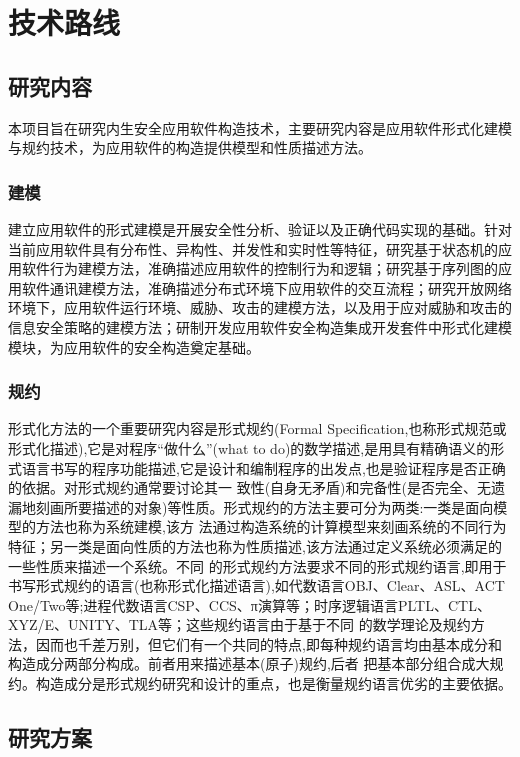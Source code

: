 \chapter{技术路线}
\section{研究内容}
本项目旨在研究内生安全应用软件构造技术，主要研究内容是应用软件形式化建模与规约技术，为应用软件的构造提供模型和性质描述方法。
\subsection{建模}
\par
建立应用软件的形式建模是开展安全性分析、验证以及正确代码实现的基础。针对当前应用软件具有分布性、异构性、并发性和实时性等特征，研究基于状态机的应用软件行为建模方法，准确描述应用软件的控制行为和逻辑；研究基于序列图的应用软件通讯建模方法，准确描述分布式环境下应用软件的交互流程；研究开放网络环境下，应用软件运行环境、威胁、攻击的建模方法，以及用于应对威胁和攻击的信息安全策略的建模方法；研制开发应用软件安全构造集成开发套件中形式化建模模块，为应用软件的安全构造奠定基础。
\par
\subsection{规约}
\par
形式化方法的一个重要研究内容是形式规约(Formal Specification,也称形式规范或形式化描述),它是对程序“做什么”(what to do)的数学描述,是用具有精确语义的形式语言书写的程序功能描述,它是设计和编制程序的出发点,也是验证程序是否正确的依据。对形式规约通常要讨论其一 致性(自身无矛盾)和完备性(是否完全、无遗漏地刻画所要描述的对象)等性质。形式规约的方法主要可分为两类:一类是面向模型的方法也称为系统建模,该方 法通过构造系统的计算模型来刻画系统的不同行为特征；另一类是面向性质的方法也称为性质描述,该方法通过定义系统必须满足的一些性质来描述一个系统。不同 的形式规约方法要求不同的形式规约语言,即用于书写形式规约的语言(也称形式化描述语言),如代数语言OBJ、Clear、ASL、ACT One/Two等;进程代数语言CSP、CCS、π演算等；时序逻辑语言PLTL、CTL、XYZ/E、UNITY、TLA等；这些规约语言由于基于不同 的数学理论及规约方法，因而也千差万别，但它们有一个共同的特点,即每种规约语言均由基本成分和构造成分两部分构成。前者用来描述基本(原子)规约,后者 把基本部分组合成大规约。构造成分是形式规约研究和设计的重点，也是衡量规约语言优劣的主要依据。
\par
\section{研究方案}
